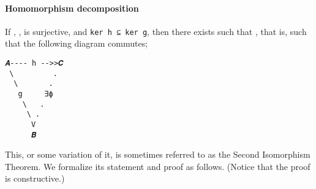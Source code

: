 \paragraph{Homomorphism decomposition}\label{homomorphism-decomposition}

If , ,  is
surjective, and \texttt{ker\ h\ ⊆\ ker\ g}, then there exists
 such that , that is, such
that the following diagram commutes;

\begin{verbatim}
𝑨---- h -->>𝑪
 \         .
  \       .
   g     ∃ϕ
    \   .
     \ .
      V
      𝑩
\end{verbatim}

This, or some variation of it, is sometimes referred to as the Second
Isomorphism Theorem. We formalize its statement and proof as follows.
(Notice that the proof is constructive.)
\ccpad
